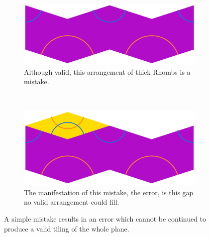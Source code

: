 \documentclass[
  oneside,
  11pt, a4paper,
  footinclude=true,
  headinclude=true,
  cleardoublepage=empty
]{scrbook}
\begin{document}
\begin{figure}[h]
\centering
\begin{subfigure}{0.6\textwidth}
\includegraphics[width=\textwidth]{Mistake}
\caption{Although valid, this arrangement of thick Rhombs is a mistake.}
\label{fig:mistake}
\end{subfigure}\\
\begin{subfigure}{0.6\textwidth}
\includegraphics[width=\textwidth]{MistakeNext}
\caption{The manifestation of this mistake, the error, is this gap no valid arrangement could fill.}
\label{fig:error}
\end{subfigure}
\caption{A simple mistake results in an error which cannot be continued to produce a valid tiling of the whole plane.}
\label{fig:mistakes}
\end{figure}
\end{document}
